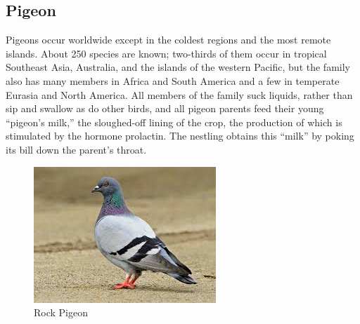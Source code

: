 \subsection{Pigeon}
Pigeons occur worldwide except in the coldest regions and the most remote islands. About 250 species are known; two-thirds of them occur in tropical Southeast Asia, Australia, and the islands of the western Pacific, but the family also has many members in Africa and South America and a few in temperate Eurasia and North America. All members of the family suck liquids, rather than sip and swallow as do other birds, and all pigeon parents feed their young “pigeon’s milk,” the sloughed-off lining of the crop, the production of which is stimulated by the hormone prolactin. The nestling obtains this “milk” by poking its bill down the parent’s throat.
\begin{figure}[htp]
    \centering
    \includegraphics{images (12).jpeg}
    \caption{Rock Pigeon}
\end{figure}
